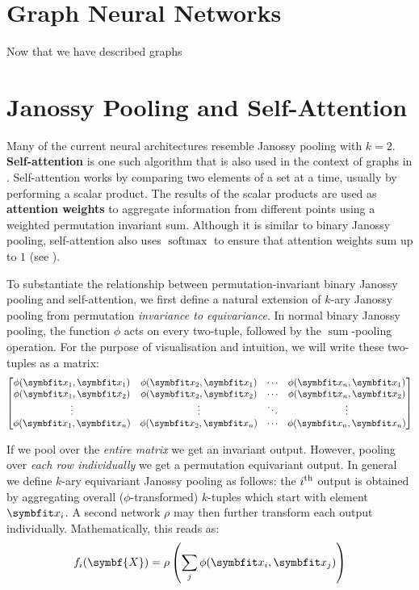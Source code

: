 \section{Graph Neural Networks}\label{sec:graph-nn}

Now that we have described graphs 


\section{Janossy Pooling and Self-Attention}\label{sec:jan-attn}

Many of the current neural architectures resemble Janossy pooling with $k=2$.
\textbf{Self-attention} \parencite{vaswani2017attention} is one such algorithm that is also used in the context of graphs in \samptr. Self-attention works by comparing two elements of a set at a time, usually by performing a scalar product.
The results of the scalar products are used as \textbf{attention weights} to aggregate information from different points using a weighted permutation invariant sum. Although it is similar to binary Janossy pooling, self-attention also uses $\operatorname{softmax}$ to ensure that attention weights sum up to $1$ (see ).

To substantiate the relationship between permutation-invariant binary Janossy pooling and self-attention, we first define a natural extension of $k$-ary Janossy pooling from permutation \textit{invariance to equivariance}. In normal binary Janossy pooling, the function $\phi$ acts on every two-tuple, followed by the $\operatorname{sum}$-pooling operation. For the purpose of visualisation and intuition, we will write these two-tuples as a matrix:
\[
\begin{bmatrix}
\phi(\bfitx_1, \bfitx_1) & \phi(\bfitx_2, \bfitx_1) & \cdots & \phi(\bfitx_n, \bfitx_1) \\
\phi(\bfitx_1, \bfitx_2) & \phi(\bfitx_2, \bfitx_2) & \cdots & \phi(\bfitx_n, \bfitx_2) \\
\vdots                   &  \vdots              & \ddots & \vdots         \\
\phi(\bfitx_1, \bfitx_n) & \phi(\bfitx_2, \bfitx_n) & \cdots & \phi(\bfitx_n, \bfitx_n)
\end{bmatrix}
\]

If we pool over the \textit{entire matrix} we get an invariant output. However, pooling over \textit{each row individually} we get a permutation equivariant output.
In general we define $k$-ary equivariant Janossy pooling as follows: the $i\textsuperscript{th}$ output is obtained by aggregating overall ($\phi$-transformed) $k$-tuples which start with element $\bfitx_i$. A second network $\rho$ may then further transform each output individually. Mathematically, this reads as:
\begin{equation}
    f_i(\symbf{X}) = \rho \left( \sum_j \phi(\bfitx_i, \bfitx_j) \right)
\end{equation}

